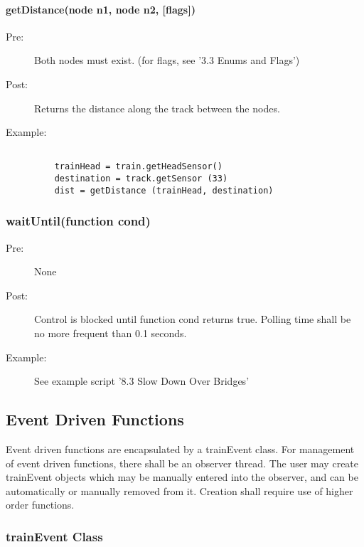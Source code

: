 \documentclass[a4paper,11pt,notitlepage]{article}
\begin{document}
\paragraph{getDistance(node n1, node n2, [flags])}
\begin{description}
\item[\hspace{1cm}Pre:] Both nodes must exist. (for flags, see '3.3 Enums and Flags')
\item[\hspace{1cm}Post:] Returns the distance along the track between the nodes.
\item[\hspace{1cm}Example:]
\begin{verbatim}

    trainHead = train.getHeadSensor()
    destination = track.getSensor (33)
    dist = getDistance (trainHead, destination)
\end{verbatim}
\end{description}


\subsubsection{waitUntil(function cond)}
\begin{description}
\item[\hspace{1cm}Pre:] None
\item[\hspace{1cm}Post:] Control is blocked until function cond returns true. Polling time shall be no more frequent than 0.1 seconds.
\item[\hspace{1cm}Example:] See example script '8.3 Slow Down Over Bridges'
\end{description}

\subsection{Event Driven Functions}
Event driven functions are encapsulated by a trainEvent class. For management of event driven functions, there shall be an observer thread. The user may create trainEvent objects which may be manually entered into the observer, and can be automatically or manually removed from it. Creation shall require use of higher order functions.
\subsubsection{trainEvent Class}
\end{document}
